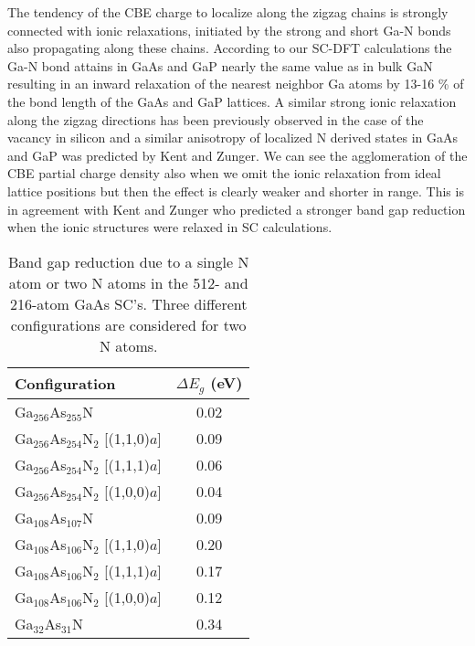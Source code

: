 \documentclass[aps,prb,10pt,twocolumn,groupedaddress]{revtex4-1}
\begin{document}
The tendency of the CBE charge to localize along the zigzag chains
is strongly connected with ionic relaxations, initiated by the strong and short 
Ga-N bonds also propagating along these chains. According to our SC-DFT
calculations the Ga-N bond attains in GaAs and GaP nearly the same value as in 
bulk GaN resulting in an inward relaxation of the nearest neighbor Ga  atoms by 
13-16 \% of the bond length of the GaAs and GaP lattices. A similar strong
ionic relaxation along the zigzag directions has been previously observed
in the case of the vacancy in silicon \cite{wang_cz} and a
similar anisotropy of localized N derived states in GaAs and GaP was
predicted by Kent and Zunger.\cite{zunger1} We can see the
agglomeration of the CBE partial charge density also when we omit the 
ionic relaxation from ideal lattice
positions but then the effect is clearly weaker and shorter in range. This 
is  in agreement with Kent and Zunger \cite{zunger1} who
predicted a  stronger band gap reduction when the ionic structures were relaxed 
in SC  calculations.
\begin{center}
  \begin{table}[!t]
    \caption{Band gap reduction due to a single N atom or two N atoms
      in the 512- and 216-atom  GaAs SC's. Three different
      configurations are considered for two N atoms.}
    \begin{tabular*}{0.4\textwidth}{@{\extracolsep{\fill}}lc}
      \hline \hline Configuration & $\Delta E_g$ (eV)
      \\ \hline 
         Ga$_{256}$As$_{255}$N                  & 0.02
      \\ Ga$_{256}$As$_{254}$N$_2$ [(1,1,0)$a$] & 0.09
      \\ Ga$_{256}$As$_{254}$N$_2$ [(1,1,1)$a$] & 0.06
      \\ Ga$_{256}$As$_{254}$N$_2$ [(1,0,0)$a$] & 0.04
      \\ Ga$_{108}$As$_{107}$N                  & 0.09
      \\ Ga$_{108}$As$_{106}$N$_2$ [(1,1,0)$a$] & 0.20
      \\ Ga$_{108}$As$_{106}$N$_2$ [(1,1,1)$a$] & 0.17
      \\ Ga$_{108}$As$_{106}$N$_2$ [(1,0,0)$a$] & 0.12 
      \\ Ga$_{32}$As$_{31}$N                   & 0.34
      \\ \hline
      \hline
    \end{tabular*}
    \label{tab:configurations}
  \end{table}
\end{center}
\end{document}
